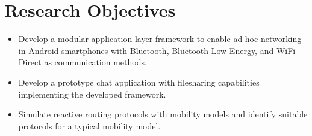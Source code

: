 \section{Research Objectives}

\begin{itemize}
      \item Develop a modular application layer framework to enable ad hoc
            networking in
            Android smartphones with Bluetooth, Bluetooth Low Energy, and WiFi Direct
            as
            communication methods.
      \item Develop a prototype chat application with filesharing capabilities
            implementing
            the developed framework.
      \item Simulate reactive routing protocols with mobility models and
            identify suitable
            protocols for a typical mobility model.
\end{itemize}
